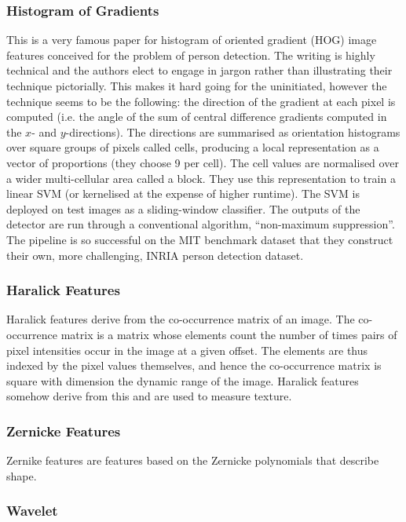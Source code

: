 \documentclass[11pt]{amsart}
\begin{document}
\subsubsection{Histogram of Gradients}

This is a very famous paper for histogram of oriented gradient (HOG) image features conceived for the problem of person detection. The writing is highly technical and the authors elect to engage in jargon rather than illustrating their technique pictorially. This makes it hard going for the uninitiated, however the technique seems to be the following: the direction of the gradient at each pixel is computed (i.e. the angle of the sum of central difference gradients computed in the $x$- and $y$-directions). The directions are summarised as orientation histograms over square groups of pixels called cells, producing a local representation as a vector of proportions (they choose 9 per cell). The cell values are normalised over a wider multi-cellular area called a block. They use this representation to train a linear SVM (or kernelised at the expense of higher runtime). The SVM is deployed on test images as a sliding-window classifier. The outputs of the detector are run through a conventional algorithm, ``non-maximum suppression''. The pipeline is so successful on the MIT benchmark dataset that they construct their own, more challenging, INRIA person detection dataset.

\subsubsection{Haralick Features}

Haralick features derive from the co-occurrence matrix of an image. The co-occurrence matrix is a matrix whose elements count the number of times pairs of pixel intensities occur in the image at a given offset. The elements are thus indexed by the pixel values themselves, and hence the co-occurrence matrix is square with dimension the dynamic range of the image. Haralick features somehow derive from this and are used to measure texture.

\subsubsection{Zernicke Features}

Zernike features are features based on the Zernicke polynomials that describe shape.

\subsubsection{Wavelet}
\end{document}
